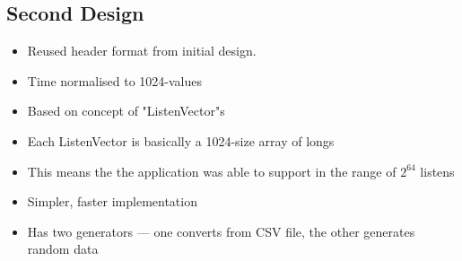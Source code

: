 \begin{itemize}
\subsection{Second Design}
\begin{itemize}
\item Reused header format from initial design.
\item Time normalised to 1024-values
\item Based on concept of "ListenVector"s
\item Each ListenVector is basically a 1024-size array of longs
\item This means the the application was able to support in the range of $2^{64}$ listens
\item Simpler, faster implementation
\item Has two generators --- one converts from CSV file, the other generates random data
\end{itemize}
\end{itemize}

